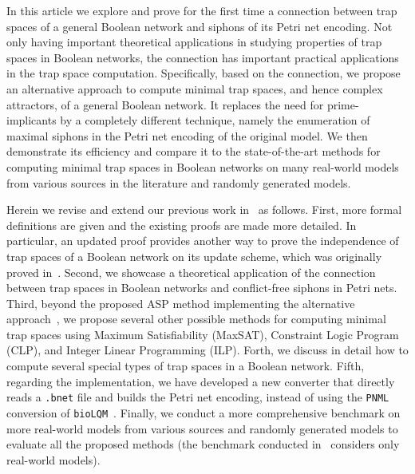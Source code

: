 \documentclass[preprint,12pt]{elsarticle}
\begin{document}
In this article we explore and prove for the first time a connection between trap spaces of a general Boolean network and siphons of its Petri net encoding.
Not only having important theoretical applications in studying properties of trap spaces in Boolean networks, the connection has important practical applications in the trap space computation.
Specifically, based on the connection, we propose an alternative approach to compute minimal trap spaces, and hence complex attractors, of a general Boolean network.
It replaces the need for prime-implicants by a completely different technique, namely the enumeration of maximal siphons in the Petri net encoding of the original model.
We then demonstrate its efficiency and compare it to the state-of-the-art methods for computing minimal trap spaces in Boolean networks on many real-world models from various sources in the literature and randomly generated models.



Herein we revise and extend our previous work in~\cite{DBLP:conf/cmsb/TrinhBHS22} as follows.
First, more formal definitions are given and the existing proofs are made more detailed.
In particular, an updated proof provides another way to prove the independence of trap spaces of a Boolean network on its update scheme, which was originally proved in~\cite{klarner2015computing}.
Second, we showcase a theoretical application of the connection between trap spaces in Boolean networks and conflict-free siphons in Petri nets.
Third, beyond the proposed ASP method implementing the alternative approach~\cite{DBLP:conf/cmsb/TrinhBHS22}, we propose several other possible methods for computing minimal trap spaces using Maximum Satisfiability (MaxSAT), Constraint Logic Program (CLP), and Integer Linear Programming (ILP).
Forth, we discuss in detail how to compute several special types of trap spaces in a Boolean network.
Fifth, regarding the implementation, we have developed a new converter that directly reads a \texttt{.bnet} file and builds the Petri net encoding, instead of using the \texttt{PNML} conversion of \texttt{bioLQM}~\cite{DBLP:conf/cmsb/TrinhBHS22}.
Finally, we conduct a more comprehensive benchmark on more real-world models from various sources and randomly generated models to evaluate all the proposed methods (the benchmark conducted in~\cite{DBLP:conf/cmsb/TrinhBHS22} considers only real-world models).
\end{document}
